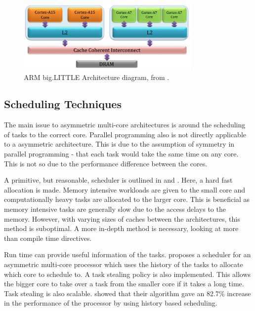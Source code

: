 \begin{figure}
\centering
\includegraphics[width=0.8\textwidth]{Figures/armbiglittle.png}
\caption{ARM big.LITTLE Architecture diagram, from \cite{muthukaruppan2013hierarchical}.}
\label{fig:bigLITTLE:arch}
\end{figure}


\subsection{Scheduling Techniques}

The main issue to asymmetric multi-core architectures is around the scheduling of tasks to the correct core.
Parallel programming also is not directly applicable to a asymmetric architecture. 
This is due to the assumption of symmetry in parallel programming - that each task would take the same time on any core. 
This is not so due to the performance difference between the cores.

A primitive, but reasonable, scheduler is outlined in \cite{esmaeilzadeh2011dark} and \cite{jimenez2009predictive}.
Here, a hard fast allocation is made. 
Memory intensive workloads are given to the small core and computationally heavy tasks are allocated to the larger core. 
This is beneficial as memory intensive tasks are generally slow due to the access delays to the memory. 
However, with varying sizes of caches between the architectures, this method is suboptimal. 
A more in-depth method is necessary, looking at more than compile time directives.



Run time can provide useful information of the tasks. 
\cite{chen2012wats} proposes a scheduler for an asymmetric multi-core processor which uses the history of the tasks to allocate which core to schedule to. %
A task stealing policy is also implemented. 
This allows the bigger core to take over a task from the smaller core if it takes a long time.
Task stealing is also scalable. 
\cite{chen2012wats} showed that their algorithm gave an 82.7\% increase in the performance of the processor by using history based scheduling.

